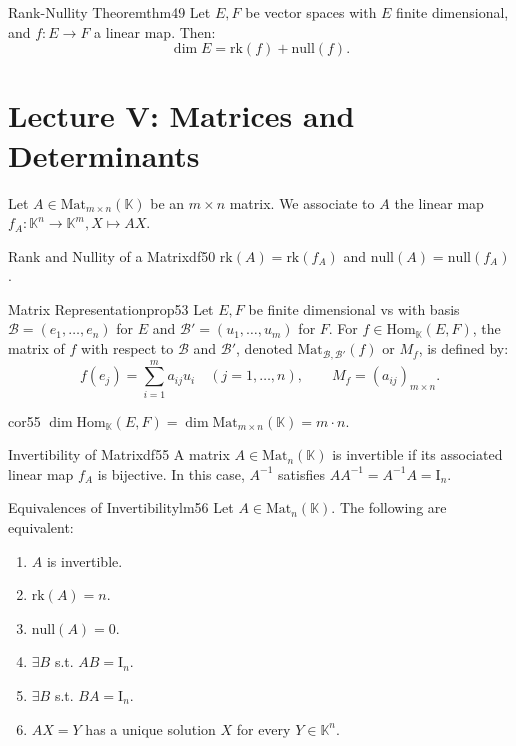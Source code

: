 \documentclass[11pt, a4paper]{article}
\newcommand{\K}{\mathbb{K}}
\begin{document}
\begin{theorem}{Rank-Nullity Theorem}{thm49}
  Let $E, F$ be vector spaces with $E$ finite dimensional, and $f: E \to F$ a linear map. Then:
  \[
    \dim E = \text{rk}(f) + \text{null}(f).
  \]
\end{theorem}

\section{Lecture V: Matrices and Determinants}

Let $A \in \text{Mat}_{m \times n}(\K)$ be an $m \times n$ matrix. We associate to $A$ the linear map $f_A: \K^n \to \K^m, X \mapsto AX$.

\begin{definition}{Rank and Nullity of a Matrix}{df50}
  $\text{rk}(A) = \text{rk}(f_A)$ and $\text{null}(A) = \text{null}(f_A)$.
\end{definition}

\begin{proposition}{Matrix Representation}{prop53}
  Let $E, F$ be finite dimensional vs with basis $\mathcal{B} = (e_1, \dots, e_n)$ for $E$ and $\mathcal{B}' = (u_1, \dots, u_m)$ for $F$.
  For $f \in \text{Hom}_\K(E, F)$, the matrix of $f$ with respect to $\mathcal{B}$ and $\mathcal{B}'$, denoted $\text{Mat}_{\mathcal{B}, \mathcal{B}'}(f)$ or $M_f$, is defined by:
  \[
    f(e_j) = \sum_{i=1}^m a_{ij} u_i \quad (j = 1, \dots, n), \qquad M_f = (a_{ij})_{m \times n}.
  \]
\end{proposition}

\begin{corollary}{}{cor55}
  $\dim \text{Hom}_\K(E, F) = \dim \text{Mat}_{m \times n}(\K) = m \cdot n$.
\end{corollary}

\begin{definition}{Invertibility of Matrix}{df55}
  A matrix $A \in \text{Mat}_n(\K)$ is invertible if its associated linear map $f_A$ is bijective. In this case, $A^{-1}$ satisfies $A A^{-1} = A^{-1} A = \text{I}_n$.
\end{definition}

\begin{lemma}{Equivalences of Invertibility}{lm56}
  Let $A \in \text{Mat}_n(\K)$. The following are equivalent:
  \begin{enumerate}
    \item $A$ is invertible.
    \item $\text{rk}(A) = n$.
    \item $\text{null}(A) = 0$.
    \item $\exists B$ s.t. $AB = \text{I}_n$.
    \item $\exists B$ s.t. $BA = \text{I}_n$.
    \item $AX = Y$ has a unique solution $X$ for every $Y \in \K^n$.
  \end{enumerate}
\end{lemma}
\end{document}
